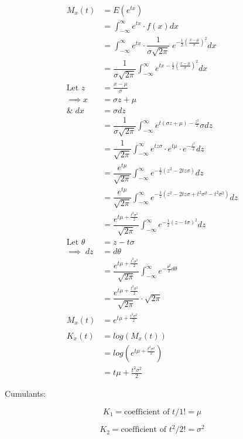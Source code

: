 \documentclass[
10pt, %
a4paper, %
]{report}
\begin{document}
\begin{align*}
    M_x(t) &= E(e^{tx}) \\
           &= \int_{-\infty}^\infty e^{tx} \cdot f(x) dx \\
           &= \int_{-\infty}^\infty e^{tx} \cdot \dfrac{1}{\sigma\sqrt{2\pi}} \; e^{-\frac{1}{2}( \frac{x-\mu}{\sigma})^2} dx \\
           &= \dfrac{1}{\sigma\sqrt{2\pi}} \int_{-\infty}^\infty e^{tx-\frac{1}{2}( \frac{x-\mu}{\sigma})^2} dx \\
           \text{Let } z &= \frac{x-\mu}{\sigma} \\ \implies x &= \sigma z + \mu \\ \& \; dx &= \sigma dz \\
           &= \dfrac{1}{\sigma\sqrt{2\pi}} \int_{-\infty}^\infty e^{t(\sigma z + \mu) - \frac{z^2}{2}} \sigma dz\\
           &= \dfrac{1}{\sqrt{2\pi}} \int_{-\infty}^\infty e^{tz\sigma} \cdot e^{t\mu} \cdot e^{- \frac{z^2}{2}} dz \\
           &= \dfrac{e^{t\mu}}{\sqrt{2\pi}} \int_{-\infty}^\infty e^{-\frac{1}{2} (z^2-2tz\sigma)} dz\\
           &= \dfrac{e^{t\mu}}{\sqrt{2\pi}} \int_{-\infty}^\infty e^{-\frac{1}{2} (z^2-2tz\sigma + t^2 \sigma^2 -t^2 \sigma^2)} dz\\
           &= \dfrac{e^{t\mu+\frac{t^2\sigma^2}{2}}}{\sqrt{2\pi}} \int_{-\infty}^\infty e^{-\frac{1}{2} (z-t\sigma)^2} dz\\
           \text{Let } \theta &= z-t\sigma \\ \implies \; dz &= d\theta \\
           &= \dfrac{e^{t\mu+\frac{t^2\sigma^2}{2}}}{\sqrt{2\pi}} \int_{-\infty}^\infty e^{-\frac{\theta^2}{2} d\theta} \\
           &= \dfrac{e^{t\mu+\frac{t^2\sigma^2}{2}}}{\sqrt{2\pi}} \cdot \sqrt{2\pi} \\
    M_x(t) &= e^{t\mu+\frac{t^2\sigma^2}{2}} \\ \\
    K_x(t) &= log(M_x(t)) \\
           &= log(e^{t\mu+\frac{t^2\sigma^2}{2}}) \\
           &= t\mu+\frac{t^2\sigma^2}{2}
\end{align*}

Cumulants:

\[
K_1 = \text{coefficient of } t/1! = \mu
\]

\[
K_2 = \text{coefficient of } t^2/2! = \sigma^2
\]
\end{document}
